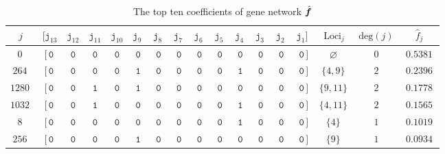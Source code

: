 \documentclass[letterpaper,11pt]{article}
\newcommand{\bs}[1]{{\boldsymbol{#1}}}
\newcommand{\gr}[1]{( #1 )}
\newcommand{\set}[1]{\{ #1 \}}
\newcommand{\bcode}[1]{\texttt{#1}}
\newcommand{\hatbsf}{{\kern+0.25em}\hat{{\kern-0.25em}\bs{f}}}
\theoremstyle{definition} \newtheorem{remark}{Remark}
\begin{document}
\begin{table}[!hbt]
\centering
\setlength\tabcolsep{2.5pt}
\caption{The top ten coefficients of gene network $\hatbsf$} \label{Tab:Entacmaea_top-10_interactions}
\vspace{5pt}
\begin{tabular}{c|ccccccccccccc|c|c||c}

    \multicolumn{1}{c}{$j$} &
    $\,[\bcode{j}_{13}\!$ & $\bcode{j}_{12}$ & $\bcode{j}_{11}$ & $\bcode{j}_{10}$ & $\bcode{j}_{9\;}$ & $\bcode{j}_{8\;}$ & $\bcode{j}_{7\;}$ & $\bcode{j}_{6\;}$ & $\bcode{j}_{5\;}$ & $\bcode{j}_{4\;}$ & $\bcode{j}_{3\;}$ & $\bcode{j}_{2\;}$ & \multicolumn{1}{c}{$\bcode{j}_1]\,$}
    & \multicolumn{1}{c}{$\text{Loci}_j$} & \multicolumn{1}{c}{$\text{deg}\gr{j}$} & \multicolumn{1}{c}{$\quad\: \hat{f}_j \quad\:$} \\

    \hline

    $0\,$ & $\![\,\bcode{0}$ & $\bcode{0}$ & $\bcode{0}$ & $\bcode{0}$ & $\bcode{0}$ & $\bcode{0}$ & $\bcode{0}$ & $\bcode{0}$ & $\bcode{0}$ & $\bcode{0}$ & $\bcode{0}$ & $\bcode{0}$ & $\,\bcode{0}\,]$ & $\varnothing\,$ & $0$ & $0.5381$ \\

    $264\,$ & $\![\,\bcode{0}$ & $\bcode{0}$ & $\bcode{0}$ & $\bcode{0}$ & $\bcode{1}$ & $\bcode{0}$ & $\bcode{0}$ & $\bcode{0}$ & $\bcode{0}$ & $\bcode{1}$ & $\bcode{0}$ & $\bcode{0}$ & $\,\bcode{0}\,]$ & $\set{4,9}\,$ & $2$ & $0.2396$ \\

    $1280\,$ & $\![\,\bcode{0}$ & $\bcode{0}$ & $\bcode{1}$ & $\bcode{0}$ & $\bcode{1}$ & $\bcode{0}$ & $\bcode{0}$ & $\bcode{0}$ & $\bcode{0}$ & $\bcode{0}$ & $\bcode{0}$ & $\bcode{0}$ & $\,\bcode{0}\,]$ & $\set{9,11}\,$ & $2$ & $0.1778$ \\

    $1032\,$ & $\![\,\bcode{0}$ & $\bcode{0}$ & $\bcode{1}$ & $\bcode{0}$ & $\bcode{0}$ & $\bcode{0}$ & $\bcode{0}$ & $\bcode{0}$ & $\bcode{0}$ & $\bcode{1}$ & $\bcode{0}$ & $\bcode{0}$ & $\,\bcode{0}\,]$ & $\set{4,11}\,$ & $2$ & $0.1565$ \\

    $8\,$ & $\![\,\bcode{0}$ & $\bcode{0}$ & $\bcode{0}$ & $\bcode{0}$ & $\bcode{0}$ & $\bcode{0}$ & $\bcode{0}$ & $\bcode{0}$ & $\bcode{0}$ & $\bcode{1}$ & $\bcode{0}$ & $\bcode{0}$ & $\,\bcode{0}\,]$ & $\set{4}\,$ & $1$ & $0.1019$ \\

    $256\,$ & $\![\,\bcode{0}$ & $\bcode{0}$ & $\bcode{0}$ & $\bcode{0}$ & $\bcode{1}$ & $\bcode{0}$ & $\bcode{0}$ & $\bcode{0}$ & $\bcode{0}$ & $\bcode{0}$ & $\bcode{0}$ & $\bcode{0}$ & $\,\bcode{0}\,]$ & $\set{9}\,$ & $1$ & $0.0934$ \\


\end{tabular}
\end{table}
\end{document}
